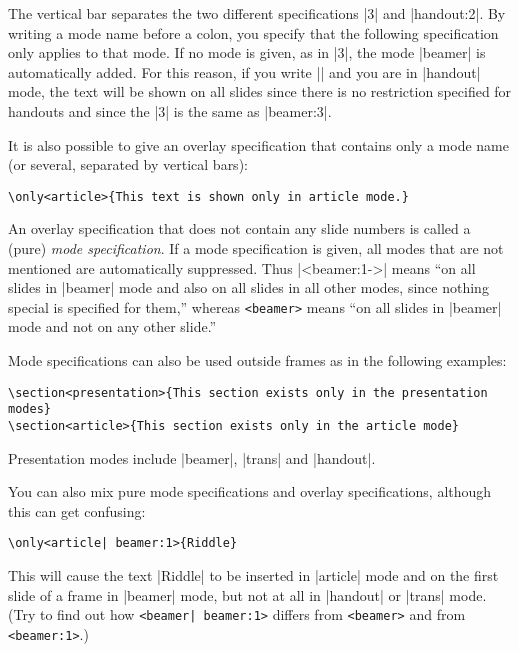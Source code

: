 \begin{original...}
The vertical bar separates the two different specifications |3| and |handout:2|. By writing a mode name before a colon, you specify that the following specification only applies to that mode. If no mode is given, as in |3|, the mode |beamer| is automatically added. For this reason, if you write || and you are in |handout| mode, the text will be shown on all slides since there is no restriction specified for handouts and since the |3| is the same as |beamer:3|.

It is also possible to give an overlay specification that contains only a mode name (or several, separated by vertical bars):
\begin{Verbatim}
\only<article>{This text is shown only in article mode.}
\end{Verbatim}

An overlay specification that does not contain any slide numbers is called a (pure) \emph{mode specification}. If a mode specification is given, all modes that are not mentioned are automatically suppressed. Thus |<beamer:1->| means ``on all slides in |beamer| mode and also on all slides in all other modes, since nothing special is specified for them,'' whereas \Verb|<beamer>| means ``on all slides in |beamer| mode and not on any other slide.''

Mode specifications can also be used outside frames as in the following examples:
\begin{Verbatim}
\section<presentation>{This section exists only in the presentation modes}
\section<article>{This section exists only in the article mode}
\end{Verbatim}

Presentation modes include |beamer|, |trans| and |handout|.

You can also mix pure mode specifications and overlay specifications, although this can get confusing:
\begin{Verbatim}
\only<article| beamer:1>{Riddle}
\end{Verbatim}

This will cause the text |Riddle| to be inserted in |article| mode and on the first slide of a frame in |beamer| mode, but not at all in |handout| or |trans| mode. (Try to find out how \Verb/<beamer| beamer:1>/ differs from \Verb|<beamer>| and from \Verb|<beamer:1>|.)


\end{original...}
